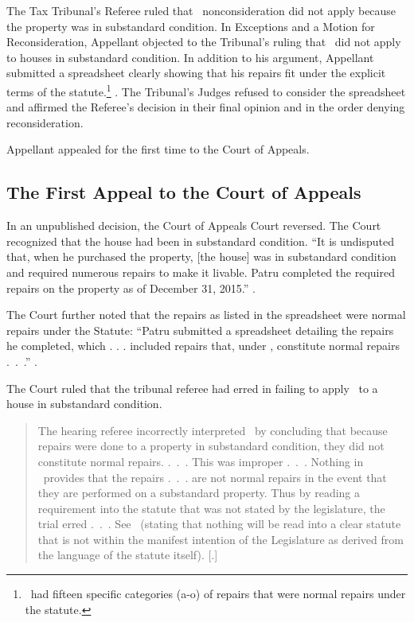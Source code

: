 \documentclass[12pt,\documentclassflag]{michiganCourtOfAppealsBrief}
\begin{document}
The Tax Tribunal's Referee ruled that \mathieuGast\ nonconsideration did not apply because the property was in substandard condition.
In Exceptions and a Motion for Reconsideration, Appellant objected to the Tribunal's ruling that \mathieuGast\ did not apply to houses in substandard condition. In addition to his argument, Appellant submitted a spreadsheet clearly showing that his repairs fit under the explicit terms of the statute.\footnote{\mathieuGast\ had fifteen specific categories (a-o) of repairs that were normal repairs under the statute.} \repairs. The Tribunal's Judges refused to consider the spreadsheet and affirmed the Referee's decision in their final opinion and in the order denying reconsideration. 

Appellant appealed for the first time to the Court of Appeals.

\subsection{The First Appeal to the Court of Appeals}

In an unpublished decision, the Court of Appeals Court reversed. The Court recognized that the house had been in substandard condition. ``It is undisputed that, when he purchased the property, [the house] was in substandard condition and required numerous repairs to make it livable. Patru completed the required repairs on the property as of December 31, 2015.''
.

The Court further noted that the repairs as listed in the spreadsheet were normal repairs under the Statute: ``Patru submitted a spreadsheet detailing the repairs he completed, which . . . included repairs that, under \mathieuGast, constitute normal repairs .~.~.'' .

The Court ruled that the tribunal referee had erred in failing to apply \mathieuGast\ to a house in substandard condition.

\begin{quote}
  The hearing referee incorrectly interpreted \mathieuGast\ by concluding that because repairs were done to a property in substandard condition, they did not constitute normal repairs. .~.~. This was improper .~.~. Nothing in \mathieuGast\ provides that the repairs .~.~. are not normal repairs in the event that they are performed on a substandard property. Thus by reading a requirement into the statute that was not stated by the legislature, the trial erred .~.~. See \ (stating that nothing will be read into a clear statute that is not within the manifest intention of the Legislature as derived from the language of the statute itself).
  [.]
\end{quote}
\end{document}
